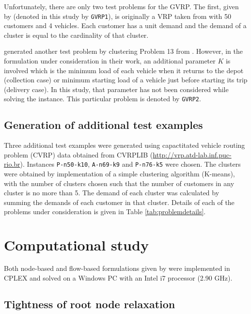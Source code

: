\documentclass[letterpaper,12pt,onehalfspacing,twoside]{article}
\theoremstyle{msds}
\begin{document}
Unfortunately, there are only two test problems for the GVRP. The first, given by \cite{GHIANI200011} (denoted in this study by \texttt{GVRP1}), is originally a VRP taken from \cite{AraqueG1994} with 50 customers and 4 vehicles. Each customer has a unit demand and the demand of a cluster is equal to the cardinality of that cluster.

\cite{bektasKara} generated another test problem by clustering Problem 13 from \cite{AraqueG1994}. However, in the formulation under consideration in their work, an additional parameter $K$ is involved which is the minimum load of each vehicle when it returns to the depot (collection case) or minimum starting load of a vehicle just before starting its trip (delivery case). In this study, that parameter has not been considered while solving the instance. This particular problem is denoted by \texttt{GVRP2}. 

\subsection{Generation of additional test examples}

Three additional test examples were generated using capactitated vehicle routing problem (CVRP) data obtained from CVRPLIB (\url{http://vrp.atd-lab.inf.puc-rio.br}). Instances \texttt{P-n50-k10}, \texttt{A-n69-k9} and \texttt{P-n76-k5} were chosen. The clusters were obtained by implementation of a simple clustering algorithm (K-means), with the number of clusters chosen such that the number of customers in any cluster is no more than 5. The demand of each cluster was calculated by summing the demands of each customer in that cluster. 
Details of each of the problems under consideration is given in Table \ref{tab:problemdetails}.

\section{Computational study}

Both node-based and flow-based formulations given by \cite{POP201297} were implemented in CPLEX and solved on a Windows PC with an Intel i7 processor (2.90 GHz). 

\subsection{Tightness of root node relaxation}
\end{document}
